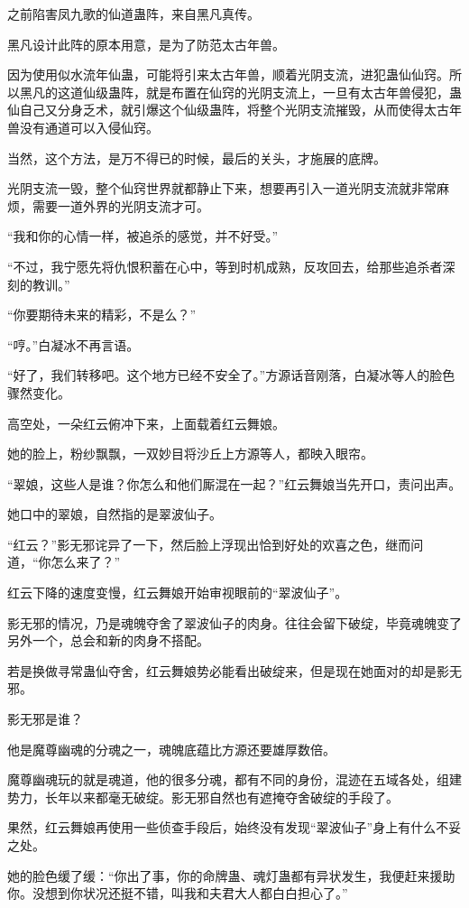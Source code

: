 \begin{this_body}
之前陷害凤九歌的仙道蛊阵，来自黑凡真传。

黑凡设计此阵的原本用意，是为了防范太古年兽。

因为使用似水流年仙蛊，可能将引来太古年兽，顺着光阴支流，进犯蛊仙仙窍。所以黑凡的这道仙级蛊阵，就是布置在仙窍的光阴支流上，一旦有太古年兽侵犯，蛊仙自己又分身乏术，就引爆这个仙级蛊阵，将整个光阴支流摧毁，从而使得太古年兽没有通道可以入侵仙窍。

当然，这个方法，是万不得已的时候，最后的关头，才施展的底牌。

光阴支流一毁，整个仙窍世界就都静止下来，想要再引入一道光阴支流就非常麻烦，需要一道外界的光阴支流才可。

“我和你的心情一样，被追杀的感觉，并不好受。”

“不过，我宁愿先将仇恨积蓄在心中，等到时机成熟，反攻回去，给那些追杀者深刻的教训。”

“你要期待未来的精彩，不是么？”

“哼。”白凝冰不再言语。

“好了，我们转移吧。这个地方已经不安全了。”方源话音刚落，白凝冰等人的脸色骤然变化。

高空处，一朵红云俯冲下来，上面载着红云舞娘。

她的脸上，粉纱飘飘，一双妙目将沙丘上方源等人，都映入眼帘。

“翠娘，这些人是谁？你怎么和他们厮混在一起？”红云舞娘当先开口，责问出声。

她口中的翠娘，自然指的是翠波仙子。

“红云？”影无邪诧异了一下，然后脸上浮现出恰到好处的欢喜之色，继而问道，“你怎么来了？”

红云下降的速度变慢，红云舞娘开始审视眼前的“翠波仙子”。

影无邪的情况，乃是魂魄夺舍了翠波仙子的肉身。往往会留下破绽，毕竟魂魄变了另外一个，总会和新的肉身不搭配。

若是换做寻常蛊仙夺舍，红云舞娘势必能看出破绽来，但是现在她面对的却是影无邪。

影无邪是谁？

他是魔尊幽魂的分魂之一，魂魄底蕴比方源还要雄厚数倍。

魔尊幽魂玩的就是魂道，他的很多分魂，都有不同的身份，混迹在五域各处，组建势力，长年以来都毫无破绽。影无邪自然也有遮掩夺舍破绽的手段了。

果然，红云舞娘再使用一些侦查手段后，始终没有发现“翠波仙子”身上有什么不妥之处。

她的脸色缓了缓：“你出了事，你的命牌蛊、魂灯蛊都有异状发生，我便赶来援助你。没想到你状况还挺不错，叫我和夫君大人都白白担心了。”


\end{this_body}
